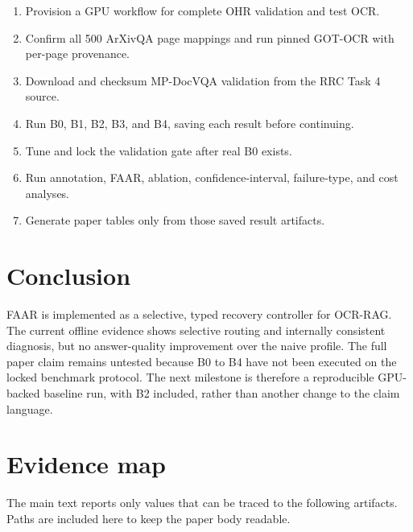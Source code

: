 \documentclass[10pt,twocolumn]{article}
\begin{document}
\begin{enumerate}[leftmargin=1.4em]
  \item Provision a GPU workflow for complete OHR validation and test OCR.
  \item Confirm all 500 ArXivQA page mappings and run pinned GOT-OCR with per-page provenance.
  \item Download and checksum MP-DocVQA validation from the RRC Task 4 source.
  \item Run B0, B1, B2, B3, and B4, saving each result before continuing.
  \item Tune and lock the validation gate after real B0 exists.
  \item Run annotation, FAAR, ablation, confidence-interval, failure-type, and cost analyses.
  \item Generate paper tables only from those saved result artifacts.
\end{enumerate}

\section{Conclusion}

FAAR is implemented as a selective, typed recovery controller for OCR-RAG. The current offline evidence shows selective routing and internally consistent diagnosis, but no answer-quality improvement over the naive profile. The full paper claim remains untested because B0 to B4 have not been executed on the locked benchmark protocol. The next milestone is therefore a reproducible GPU-backed baseline run, with B2 included, rather than another change to the claim language.

\balance
\clearpage
\onecolumn
\appendix

\section{Evidence map}
\label{app:evidence}

The main text reports only values that can be traced to the following artifacts. Paths are included here to keep the paper body readable.
\end{document}
